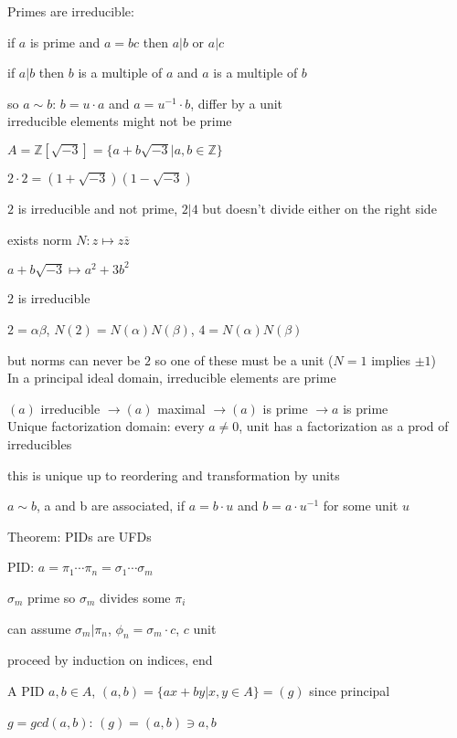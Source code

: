 \documentclass[12pt]{article}
\begin{document}
\noindent
Primes are irreducible:

if $a$ is prime and $a = bc$ then $a|b$ or $a|c$

if $a|b$ then $b$ is a multiple of $a$ and $a$ is a multiple of $b$

so $a \sim b$: $b = u \cdot a$ and $a = u^{-1} \cdot b$, differ by a unit\\

\noindent
irreducible elements might not be prime

$A = \mathds{Z}[\sqrt{-3}] = \{a + b\sqrt{-3} | a, b \in \mathds{Z}\}$

$2 \cdot 2 = (1 + \sqrt{-3})(1 - \sqrt{-3})$

$2$ is irreducible and not prime, $2 | 4$ but doesn't divide either on the right side

exists norm $N: z \mapsto z\overline{z}$

$a + b\sqrt{-3} \mapsto a^2 + 3b^2$

$2$ is irreducible

$2 = \alpha\beta$, $N(2) = N(\alpha)N(\beta)$, $4 = N(\alpha)N(\beta)$

but norms can never be $2$ so one of these must be a unit ($N = 1$ implies $\pm 1$)\\

\noindent
In a principal ideal domain, irreducible elements are prime

$(a)$ irreducible $\to (a)$ maximal $\to (a)$ is prime $\to a$ is prime\\

\noindent
Unique factorization domain: every $a \neq 0$, unit has a factorization as a prod of irreducibles

this is unique up to reordering and transformation by units

$a \sim b$, a and b are associated, if $a = b \cdot u$ and $b = a \cdot u^{-1}$ for some unit $u$

\noindent
Theorem: PIDs are UFDs

PID: $a = \pi_1 \cdots \pi_n = \sigma_1 \cdots \sigma_m$

$\sigma_m$ prime so $\sigma_m$ divides some $\pi_i$

can assume $\sigma_m | \pi_n$, $\phi_n = \sigma_m \cdot c$, $c$ unit

proceed by induction on indices, end

\noindent
A PID $a, b \in A$, $(a, b) = \{ax + by | x, y \in A\} = (g)$ since principal

$g = gcd(a, b)$: $(g) = (a, b) \ni a, b$
\end{document}
